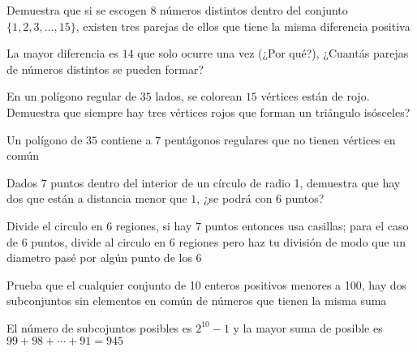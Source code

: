 \documentclass[11pt]{scrartcl}
\begin{document}
\begin{problem}
   Demuestra que si se escogen $8$ números distintos dentro del conjunto $\{1,2,3,\ldots,15\}$, existen tres parejas de ellos que tiene la misma diferencia positiva
   \begin{hint}
       La mayor diferencia es $14$ que solo ocurre una vez (¿Por qué?), ¿Cuantás parejas de números distintos se pueden formar?
   \end{hint}
\end{problem}
\vspace{0.1cm}

\begin{problem}
    En un polígono regular de $35$ lados, se colorean $15$ vértices están de rojo. Demuestra que siempre hay tres vértices rojos que forman un triángulo isósceles?
\begin{hint}
    Un polígono de $35$ contiene a $7$ pentágonos regulares que no tienen vértices en común
\end{hint}
\end{problem}
\vspace{0.1cm}
\begin{problem}
   
    Dados $7$ puntos dentro del interior de un círculo de radio 1, demuestra que hay dos que están a distancia menor que $1$, ¿se podrá con $6$ puntos?
\begin{hint}
    Divide el circulo en $6$ regiones, si hay $7$ puntos entonces usa casillas; para el caso de $6$ puntos, divide al circulo en $6$ regiones pero haz tu división de modo que un diametro pasé por algún punto de los $6$
\end{hint}
\end{problem}
\begin{problem}
Prueba que el cualquier conjunto de 10 enteros positivos menores a 100, hay dos subconjuntos
sin elementos en común de números que tienen la misma suma
\begin{hint}
    El número de subcojuntos posibles es $2^10-1$ y la mayor suma de posible es $99+98+\cdots+91=945$
\end{hint}
\end{problem}
\vspace{0.1cm}
\end{document}
